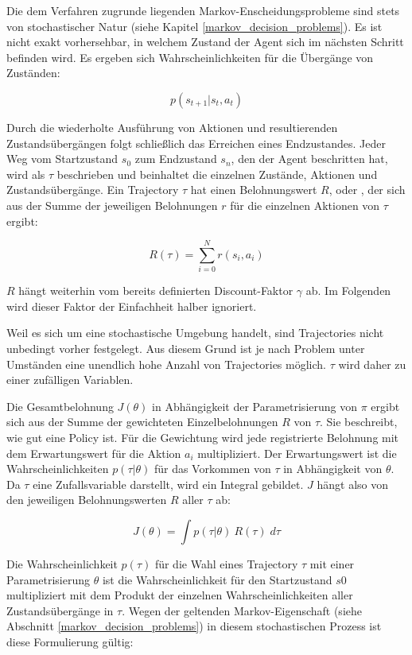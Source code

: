 Die dem Verfahren zugrunde liegenden Markov-Enscheidungsprobleme sind stets von stochastischer Natur (siehe Kapitel \ref{markov_decision_problems}). Es ist nicht exakt vorhersehbar, in welchem Zustand der Agent sich im nächsten Schritt befinden wird. Es ergeben sich Wahrscheinlichkeiten für die Übergänge von Zuständen:

$$ p(s_{t+1}|s_t,a_t) $$

Durch die wiederholte Ausführung von Aktionen und resultierenden Zustandsübergängen folgt schließlich das Erreichen eines Endzustandes. Jeder Weg vom Startzustand $s_0$ zum Endzustand $s_n$, den der Agent beschritten hat, wird als  $\tau$ beschrieben und beinhaltet die einzelnen Zustände, Aktionen und Zustandsübergänge. Ein Trajectory $\tau$ hat einen Belohnungswert $R$, oder , der sich aus der Summe der jeweiligen Belohnungen $r$ für die einzelnen Aktionen von $\tau$ ergibt:

$$   R(\tau)   =   \sum_{i=0}^N r (s_i,a_i)   $$

$R$ hängt weiterhin vom bereits definierten Discount-Faktor $\gamma$ ab. Im Folgenden wird dieser Faktor der Einfachheit halber ignoriert.

Weil es sich um eine stochastische Umgebung handelt, sind Trajectories nicht unbedingt vorher festgelegt. Aus diesem Grund ist je nach Problem unter Umständen eine unendlich hohe Anzahl von Trajectories möglich. $\tau$ wird daher zu einer zufälligen Variablen.

Die Gesamtbelohnung $J(\theta)$ in Abhängigkeit der Parametrisierung von $\pi$ ergibt sich aus der Summe der gewichteten Einzelbelohnungen $R$ von $\tau$. Sie beschreibt, wie gut eine Policy ist. Für die Gewichtung wird jede registrierte Belohnung mit dem Erwartungswert für die Aktion $a_i$ multipliziert. Der Erwartungswert ist die Wahrscheinlichkeiten $p(\tau|\theta)$ für das Vorkommen von $\tau$ in Abhängigkeit von $\theta$. Da $\tau$ eine Zufallsvariable darstellt, wird ein Integral gebildet. $J$ hängt also von den jeweiligen Belohnungswerten $R$ aller $\tau$ ab:

$$    J(\theta) = \int p(\tau|\theta) \: R(\tau) \; d\tau   $$

Die Wahrscheinlichkeit $p(\tau)$ für die Wahl eines Trajectory $\tau$ mit einer Parametrisierung $\theta$ ist die Wahrscheinlichkeit für den Startzustand $s0$ multipliziert mit dem Produkt der einzelnen Wahrscheinlichkeiten aller Zustandsübergänge in $\tau$. Wegen der geltenden Markov-Eigenschaft (siehe Abschnitt \ref{markov_decision_problems}) in diesem stochastischen Prozess ist diese Formulierung gültig:

